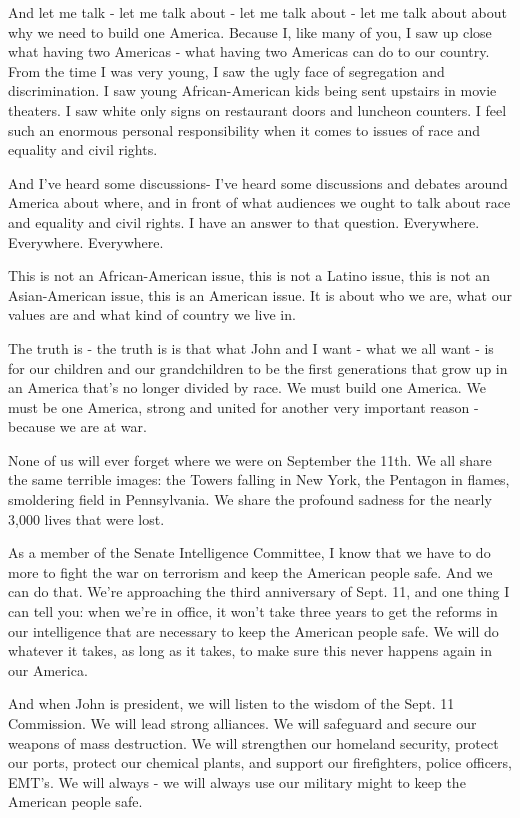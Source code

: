 And let me talk - let me talk about - let me talk about - let me talk
about about why we need to build one America. Because I, like many of
you, I saw up close what having two Americas - what having two Americas
can do to our country. From the time I was very young, I saw the ugly
face of segregation and discrimination. I saw young African-American
kids being sent upstairs in movie theaters. I saw white only signs on
restaurant doors and luncheon counters. I feel such an enormous personal
responsibility when it comes to issues of race and equality and civil
rights.

And I've heard some discussions- I've heard some discussions and debates
around America about where, and in front of what audiences we ought to
talk about race and equality and civil rights. I have an answer to that
question. Everywhere. Everywhere. Everywhere.

This is not an African-American issue, this is not a Latino issue, this
is not an Asian-American issue, this is an American issue. It is about
who we are, what our values are and what kind of country we live in.

The truth is - the truth is is that what John and I want - what we all
want - is for our children and our grandchildren to be the first
generations that grow up in an America that's no longer divided by race.
We must build one America. We must be one America, strong and united for
another very important reason - because we are at war.

None of us will ever forget where we were on September the 11th. We all
share the same terrible images: the Towers falling in New York, the
Pentagon in flames, smoldering field in Pennsylvania. We share the
profound sadness for the nearly 3,000 lives that were lost.

As a member of the Senate Intelligence Committee, I know that we have to
do more to fight the war on terrorism and keep the American people safe.
And we can do that. We're approaching the third anniversary of Sept. 11,
and one thing I can tell you: when we're in office, it won't take three
years to get the reforms in our intelligence that are necessary to keep
the American people safe. We will do whatever it takes, as long as it
takes, to make sure this never happens again in our America.

And when John is president, we will listen to the wisdom of the Sept. 11
Commission. We will lead strong alliances. We will safeguard and secure
our weapons of mass destruction. We will strengthen our homeland
security, protect our ports, protect our chemical plants, and support
our firefighters, police officers, EMT's. We will always - we will
always use our military might to keep the American people safe.

